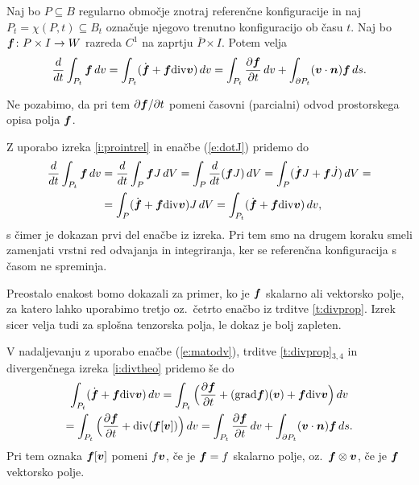 \begin{izrek} \label{i:transport}
	Naj bo $P\subseteq B$ regularno območje znotraj referenčne konfiguracije in naj
	$P_t=\chi(P,t)\subseteq B_t$ označuje njegovo trenutno konfiguracijo ob času $t$.
	Naj bo $\boldsymbol f\colon P\times I\to W$ razreda $C^1$ na zaprtju $\overline{P}\times I$.
	Potem velja
	\begin{equation*}
		\frac{d}{dt}\int_{P_t}\boldsymbol f\,dv =
		\int_{P_t}(\dot{\boldsymbol f}+\boldsymbol f\mathrm{div}\boldsymbol v)\,dv=
		\int_{P_t}\frac{\partial\boldsymbol f}{\partial t}\,dv +
		\int_{\partial P_t}(\boldsymbol v\cdot\boldsymbol n)\boldsymbol f\,ds.
	\end{equation*}
\end{izrek}
Ne pozabimo, da pri tem $\partial\boldsymbol f/\partial t$ pomeni časovni (parcialni)
odvod prostorskega opisa polja $\boldsymbol f$.

\proof
	Z uporabo izreka \ref{i:prointrel} in enačbe (\ref{e:dotJ}) pridemo do
	\begin{align*}
		\frac{d}{dt}\int_{P_t}\boldsymbol f\,dv &= \frac{d}{dt}\int_{P}\boldsymbol fJ\,dV =
		\int_{P}\frac{d}{dt}(\boldsymbol fJ)\,dV = \int_{P}(\dot{\boldsymbol f}J+\boldsymbol f\dot{J})\,dV =\\
		&=\int_{P}(\dot{\boldsymbol f}+\boldsymbol f\mathrm{div}\boldsymbol v)J\,dV = \int_{P_t}(\dot{\boldsymbol f}+\boldsymbol f\mathrm{div}\boldsymbol v)\,dv,
	\end{align*}
	s čimer je dokazan prvi del enačbe iz izreka.
	Pri tem smo na drugem koraku smeli zamenjati vrstni red odvajanja in integriranja,
	ker se referenčna konfiguracija s časom ne spreminja.
	
	Preostalo enakost bomo dokazali za primer, ko je $\boldsymbol f$ skalarno ali vektorsko
	polje, za katero lahko uporabimo tretjo oz.~četrto enačbo iz trditve \ref{t:divprop}.
	Izrek sicer velja tudi za splošna tenzorska polja, le dokaz je bolj zapleten.
	
	V nadaljevanju z uporabo enačbe (\ref{e:matodv}), trditve \ref{t:divprop}$_{3,4}$
	in divergenčnega izreka \ref{i:divtheo} pridemo še do
	\begin{multline*}
		\int_{P_t}(\dot{\boldsymbol f}+\boldsymbol f\mathrm{div}\boldsymbol v)\,dv
		=\int_{P_t}\Big(\frac{\partial\boldsymbol f}{\partial t}+
		(\mathrm{grad}\boldsymbol f)(\boldsymbol v)+\boldsymbol f\mathrm{div}\boldsymbol v\Big)\,dv \\
		=\int_{P_t}\Big(\frac{\partial\boldsymbol f}{\partial t}+\mathrm{div}(\boldsymbol f[\boldsymbol v])\Big)\,dv
		=\int_{P_t}\frac{\partial\boldsymbol f}{\partial t}\,dv+
		\int_{\partial P_t}(\boldsymbol v\cdot\boldsymbol n)\boldsymbol f\,ds.
	\end{multline*}
	Pri tem oznaka $\boldsymbol f[\boldsymbol v]$ pomeni $f\boldsymbol v$, če je $\boldsymbol f=f$ skalarno polje,
	oz.~$\boldsymbol f\otimes\boldsymbol v$, če je $\boldsymbol f$ vektorsko polje.
\endproof


